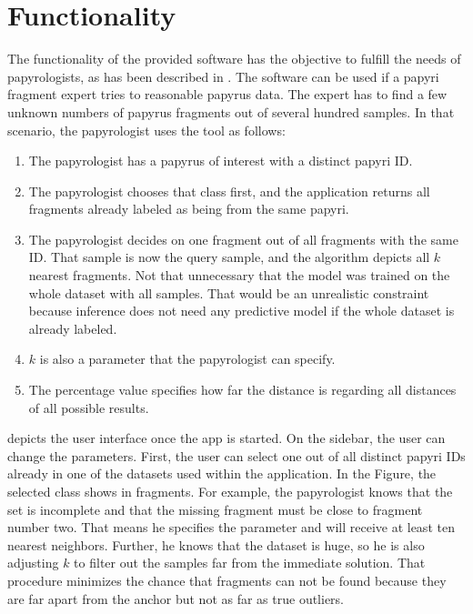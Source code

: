 \section{Functionality}
The functionality of the provided software has the objective to fulfill the needs of papyrologists, as has been described in . The software can be used if a papyri fragment expert tries to reasonable papyrus data. The expert has to find a few unknown numbers of papyrus fragments out of several hundred samples. In that scenario, the papyrologist uses the tool as follows: 
\begin{enumerate}
	\item The papyrologist has a papyrus of interest with a distinct papyri ID. 
	\item The papyrologist chooses that class first, and the application returns all fragments already labeled as being from the same papyri.  	
	\item The papyrologist decides on one fragment out of all fragments with the same ID. That sample is now the query sample, and the algorithm depicts all \(k\) nearest fragments. Not that unnecessary that the model was trained on the whole dataset with all samples. That would be an unrealistic constraint because inference does not need any predictive model if the whole dataset is already labeled. 
	\item \(k\) is also a parameter that the papyrologist can specify. 
	\item The percentage value specifies how far the distance is regarding all distances of all possible results. 
\end{enumerate}
 depicts the user interface once the app is started. On the sidebar, the user can change the parameters. First, the user can select one out of all distinct papyri IDs already in one of the datasets used within the application. In the Figure, the selected class shows in fragments. For example, the papyrologist knows that the set is incomplete and that the missing fragment must be close to fragment number two. That means he specifies the parameter and will receive at least ten nearest neighbors. Further, he knows that the dataset is huge, so he is also adjusting \(k\) to filter out the samples far from the immediate solution. That procedure minimizes the chance that fragments can not be found because they are far apart from the anchor but not as far as true outliers.